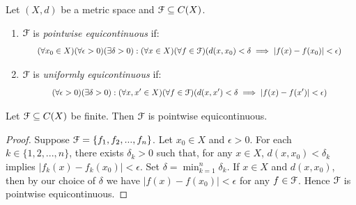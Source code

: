     \begin{definition}
        Let $(X,d)$ be a metric space and $\mathcal{F} \subseteq C(X)$.
        \begin{enumerate}[label = (\arabic*),itemsep=1pt,topsep=3pt]
            \item $\mathcal{F}$ is \textit{pointwise equicontinuous} if:
                \begin{equation*}
                \begin{split}
                    \text{{\scalebox{.85}{$(\forall x_0 \in X)(\forall \epsilon > 0)(\exists \delta > 0):(\forall x \in X)( \forall f \in \cF)(d(x,x_0) < \delta \implies |f(x) - f(x_0)| < \epsilon)$}}} 
                \end{split}
                \end{equation*}
            \item $\mathcal{F}$ is \textit{uniformly equicontinuous} if:
                \begin{equation*}
                \begin{split}
                    \text{{\scalebox{.85}{$(\forall \epsilon > 0)(\exists \delta > 0):(\forall x,x' \in X)(\forall f \in \cF)(d(x,x') < \delta \implies |f(x) - f(x')| < \epsilon)$}}} 
                \end{split}
                \end{equation*}
        \end{enumerate}
    \end{definition}

    \begin{proposition}
        Let $\mathcal{F} \subseteq C(X)$ be finite. Then $\mathcal{F}$ is pointwise equicontinuous.
    \end{proposition}
        \begin{proof}
            Suppose $\mathcal{F} = \{f_1,f_2,...,f_n\}$. Let $x_0 \in X$ and $\epsilon > 0$. For each $k \in \{1,2,...,n\}$, there exists $\delta_k > 0$ such that, for any $x \in X$, $d(x,x_0)< \delta_k$ implies $|f_k(x) - f_k(x_0)| < \epsilon$. Set $\delta = \min_{k = 1}^n \delta_k$. If $x \in X$ and $d(x,x_0)$, then by our choice of $\delta$ we have $|f(x) - f(x_0)| < \epsilon$ for any $f \in \mathcal{F}$. Hence $\mathcal{F}$ is pointwise equicontinuous.
        \end{proof}

